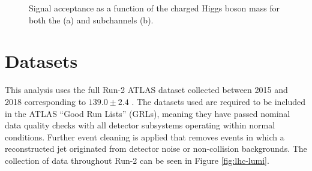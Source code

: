 			\begin{figure}[!ht]
				\centering
				\caption{\label{fig:signal-acceptance} Signal acceptance as a function of the charged Higgs boson mass for both the \taujets (a) and \taulep subchannels (b).}
			\end{figure}

	\section{Datasets}\label{sec:datasets}
		This analysis uses the full Run-2 ATLAS dataset collected between 2015 and 2018 corresponding to $139.0 \pm 2.4$ \ifb \cite{lumi-run2}. The datasets used are required to be included in the ATLAS ``Good Run Lists'' (GRLs), meaning they have passed nominal data quality checks with all detector subsystems operating within normal conditions. Further event cleaning is applied that removes events in which a reconstructed jet originated from detector noise or non-collision backgrounds. The collection of data throughout Run-2 can be seen in Figure \ref{fig:lhc-lumi}.

